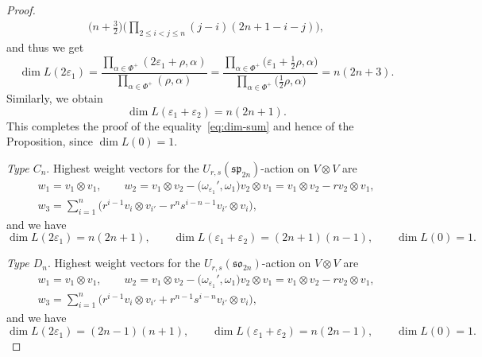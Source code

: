 \documentclass[10pt,a4paper]{amsart}
\numberwithin{equation}{section}
\newcommand{\sso}{\mathfrak{so}}
\newcommand{\ssp}{\mathfrak{sp}}
\begin{document}
\begin{proof}
\begin{gather*}
 \bigl( n + \tfrac{3}{2} \bigr) \biggl( \prod_{2 \le i < j \le n}(j - i)(2n + 1 - i - j) \biggr),
\end{gather*}
and thus we get
\begin{displaymath}
 \dim{L(2\varepsilon_{1})} =
  \frac{\prod_{\alpha \in \Phi^{+}}(2\varepsilon_{1} + \rho,\alpha)}{\prod_{\alpha \in \Phi^{+}}(\rho,\alpha)} =
  \frac{\prod_{\alpha \in \Phi^{+}}\bigl(\varepsilon_{1} + \tfrac{1}{2}\rho,\alpha\bigr)}{\prod_{\alpha \in \Phi^{+}}\bigl(\tfrac{1}{2}\rho,\alpha\bigr)} =
  n(2n + 3).
\end{displaymath}
Similarly, we obtain
\begin{displaymath}
 \dim{L(\varepsilon_{1} + \varepsilon_{2})} = n(2n + 1).
\end{displaymath}
This completes the proof of the equality~\eqref{eq:dim-sum} and hence of the Proposition, since $\dim{L(0)} = 1$.


\textit{Type $C_n$}.
Highest weight vectors for the $U_{r,s}(\ssp_{2n})$-action on $V\otimes V$ are
\begin{gather}
 w_{1} = v_{1} \otimes v_{1},\qquad
 w_{2} = v_{1} \otimes v_{2} - \bigl(\omega_{\varepsilon_{1}}',\omega_{1}\bigr)v_{2} \otimes v_{1} =
 v_{1} \otimes v_{2} - r v_{2} \otimes v_{1} , \nonumber\\
 w_{3} = \sum_{i = 1}^{n}\bigl(r^{i - 1}v_{i} \otimes v_{i'} - r^{n}s^{i - n- 1}v_{i'} \otimes v_{i}\bigr),\label{eq:C_hwv}
\end{gather}
and we have
\[
 \dim{L(2\varepsilon_{1})} = n(2n + 1) , \qquad
 \dim{L(\varepsilon_{1} + \varepsilon_{2})} = (2n + 1)(n - 1), \qquad \dim{L(0)}=1 .
\]


\textit{Type $D_n$}.
Highest weight vectors for the $U_{r,s}(\sso_{2n})$-action on $V\otimes V$ are
\begin{gather}
 w_{1} = v_{1} \otimes v_{1},\qquad
 w_{2} = v_{1} \otimes v_{2} - \bigl(\omega_{\varepsilon_{1}}',\omega_{1}\bigr)v_{2} \otimes v_{1} =
 v_{1} \otimes v_{2} - r v_{2} \otimes v_{1}, \nonumber\\
 w_{3} = \sum_{i = 1}^{n}\bigl(r^{i - 1}v_{i} \otimes v_{i'} + r^{n - 1}s^{i - n}v_{i'} \otimes v_{i}\bigr),\label{eq:D_hwv}
\end{gather}
and we have
\begin{displaymath}
 \dim{L(2\varepsilon_{1})} = (2n - 1)(n + 1), \qquad
 \dim{L(\varepsilon_{1} + \varepsilon_{2})} = n(2n - 1), \qquad \dim{L(0)}=1 . \tag*{\qed}
\end{displaymath}
\renewcommand{\qed}{}
\end{proof}
\end{document}
